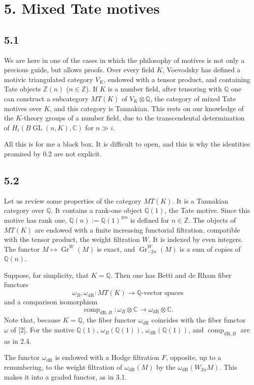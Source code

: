 \documentclass[10pt]{article}
\newcommand{\Q}{\mathbb Q}
\newcommand{\Z}{\mathbb Z}
\newcommand{\C}{\mathbb C}
\newcommand{\GL}{\operatorname{GL}}
\newcommand{\Gr}{\operatorname{Gr}}
\newcommand{\comp}{\operatorname{comp}}
\newcommand{\dR}{\mathrm{dR}}
\begin{document}
\section*{5. Mixed Tate motives}

\subsection*{5.1}
We are here in one of the cases in which the philosophy of motives is not only a precious guide, but allows proofs.
Over every field $K$, Voevodsky has defined a motivic triangulated category $V_K$, endowed with a tensor product, and containing Tate objects $\Z(n)$ ($n\in\Z$).
If $K$ is a number field, after tensoring with $\Q$ one can construct a subcategory $MT(K)$ of $V_K\otimes\Q$, the category of mixed Tate motives over $K$, and this category is Tannakian.
This rests on our knowledge of the $K$-theory groups of a number field, due to the transcendental determination of $H_i(B\GL(n,K),\C)$ for $n\gg i$.

All this is for me a black box.
It is difficult to open, and this is why the identities promised by 0.2 are not explicit.

\subsection*{5.2}
Let us review some properties of the category $MT(K)$.
It is a Tannakian category over $\Q$.
It contains a rank-one object $\Q(1)$, the Tate motive.
Since this motive has rank one, $\Q(n):=\Q(1)^{\otimes n}$ is defined for $n\in\Z$.
The objects of $MT(K)$ are endowed with a finite increasing functorial filtration, compatible with the tensor product, the weight filtration $W$.
It is indexed by even integers.
The functor $M\mapsto\Gr^W(M)$ is exact, and $\Gr^W_{-2n}(M)$ is a sum of copies of $\Q(n)$.

Suppose, for simplicity, that $K=\Q$.
Then one has Betti and de Rham fiber functors
\[
 \omega_B,\omega_{\dR}:MT(K)\longrightarrow \Q\text{-vector spaces}
\]
and a comparison isomorphism
\[
 \comp_{\dR,B}:\omega_B\otimes\C\longrightarrow \omega_{\dR}\otimes\C.
\]
Note that, because $K=\Q$, the fiber functor $\omega_{\dR}$ coincides with the fiber functor $\omega$ of [2].
For the motive $\Q(1)$, $\omega_B(\Q(1))$, $\omega_{\dR}(\Q(1))$, and $\comp_{\dR,B}$ are as in 2.4.

The functor $\omega_{\dR}$ is endowed with a Hodge filtration $F$, opposite, up to a renumbering, to the weight filtration of $\omega_{\dR}(M)$ by the $\omega_{\dR}(W_{2n}M)$.
This makes it into a graded functor, as in 3.1.
\end{document}
